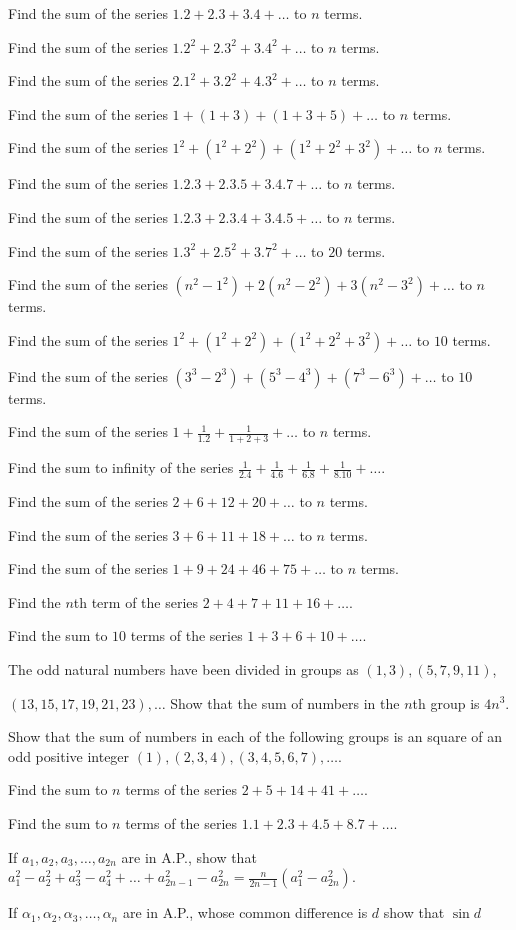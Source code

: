 \item Find the sum of the series $1.2 + 2.3 + 3.4 + \ldots$ to $n$ terms.
\item Find the sum of the series $1.2^2 + 2.3^2 + 3.4^2 + \ldots$ to $n$ terms.
\item Find the sum of the series $2.1^2 + 3.2^2 + 4.3^2 + \ldots$ to $n$ terms.
\item Find the sum of the series $1 + (1 + 3) + (1 + 3 + 5) + \ldots$ to $n$ terms.
\item Find the sum of the series $1^2 + (1^2 + 2^2) + (1^2 + 2^2 + 3^2) + \ldots$ to $n$ terms.
\item Find the sum of the series $1.2.3 + 2.3.5 + 3.4.7 + \ldots$ to $n$ terms.
\item Find the sum of the series $1.2.3 + 2.3.4 + 3.4.5 + \ldots$ to $n$ terms.
\item Find the sum of the series $1.3^2 + 2.5^2 + 3.7^2 + \ldots$ to $20$ terms.
\item Find the sum of the series $(n^2 - 1^2) + 2(n^2 - 2^2) + 3(n^2 - 3^2) + \ldots$ to $n$ terms.
\item Find the sum of the series $1^2 + (1^2 + 2^2) + (1^2 + 2^2 + 3^2) + \ldots$ to $10$ terms.
\item Find the sum of the series $(3^3 - 2^3) + (5^3 - 4^3) + (7^3 - 6^3) + \ldots$ to $10$ terms.
\item Find the sum of the series $1 + \frac{1}{1.2} + \frac{1}{1 + 2 + 3} + \ldots$ to $n$ terms.
\item Find the sum to infinity of the series $\frac{1}{2.4} + \frac{1}{4.6} + \frac{1}{6.8} + \frac{1}{8.10} + \ldots$.
\item Find the sum of the series $2 + 6 + 12 + 20 + \ldots$ to $n$ terms.
\item Find the sum of the series $3 + 6 + 11 + 18 + \ldots$ to $n$ terms.
\item Find the sum of the series $1 + 9 + 24 + 46 + 75 + \ldots$ to $n$ terms.
\item Find the $n$th term of the series $2 + 4 + 7 + 11 + 16 + \ldots$.
\item Find the sum to $10$ terms of the series $1 + 3 + 6 + 10 + \ldots$.
\item The odd natural numbers have been divided in groups as $(1, 3), (5, 7, 9, 11)$,

  $(13, 15, 17, 19, 21, 23), \ldots$
  Show that the sum of numbers in the $n$th group is $4n^3$.
\item Show that the sum of numbers in each of the following groups is an square of an odd positive integer $(1), (2,3,4),
  (3,4,5,6,7), \ldots$.
\item Find the sum to $n$ terms of the series $2 + 5 + 14 + 41 + \ldots$.
\item Find the sum to $n$ terms of the series $1.1 + 2.3 + 4.5 + 8.7 + \ldots$.
\item If $a_1, a_2, a_3, \ldots, a_{2n}$ are in A.P., show that $a_1^2 - a_2^2 + a_3^2 - a_4^2 + \ldots + a_{2n - 1}^2 -
  a_{2n}^2 = \frac{n}{2n - 1}(a_1^2 - a_{2n}^2)$.
\item If $\alpha_1, \alpha_2, \alpha_3, \ldots, \alpha_n$ are in A.P., whose common difference is $d$ show that $\sin
  d$

